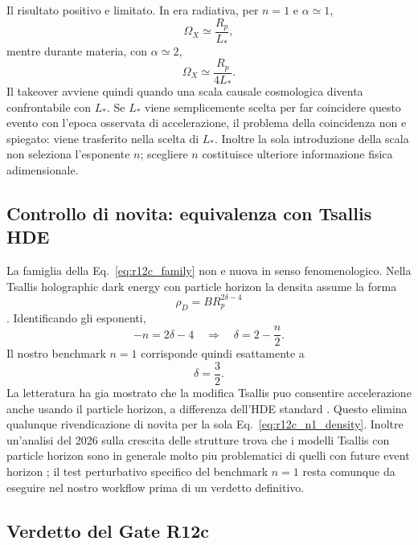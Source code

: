 \documentclass[11pt,a4paper]{article}
\begin{document}
Il risultato positivo e limitato. In era radiativa, per $n=1$ e $\alpha\simeq1$,
\begin{equation}
 \Omega_X\simeq\frac{R_p}{L_*},
\end{equation}
mentre durante materia, con $\alpha\simeq2$,
\begin{equation}
 \Omega_X\simeq\frac{R_p}{4L_*}.
\end{equation}
Il takeover avviene quindi quando una scala causale cosmologica diventa confrontabile con $L_*$. Se $L_*$ viene semplicemente scelta per far coincidere questo evento con l'epoca osservata di accelerazione, il problema della coincidenza non e spiegato: viene trasferito nella scelta di $L_*$. Inoltre la sola introduzione della scala non seleziona l'esponente $n$; scegliere $n$ costituisce ulteriore informazione fisica adimensionale.

\subsection{Controllo di novita: equivalenza con Tsallis HDE}

La famiglia della Eq.~\eqref{eq:r12c_family} non e nuova in senso fenomenologico. Nella Tsallis holographic dark energy con particle horizon la densita assume la forma
\begin{equation}
 \rho_D=B R_p^{2\delta-4}
\end{equation}
\cite{Zadeh2018}. Identificando gli esponenti,
\begin{equation}
 -n=2\delta-4
 \quad\Longrightarrow\quad
 \delta=2-\frac n2.
\end{equation}
Il nostro benchmark $n=1$ corrisponde quindi esattamente a
\begin{equation}
 \boxed{\delta=\frac32.}
\end{equation}
La letteratura ha gia mostrato che la modifica Tsallis puo consentire accelerazione anche usando il particle horizon, a differenza dell'HDE standard \cite{Zadeh2018}. Questo elimina qualunque rivendicazione di novita per la sola Eq.~\eqref{eq:r12c_n1_density}. Inoltre un'analisi del 2026 sulla crescita delle strutture trova che i modelli Tsallis con particle horizon sono in generale molto piu problematici di quelli con future event horizon \cite{Das2026}; il test perturbativo specifico del benchmark $n=1$ resta comunque da eseguire nel nostro workflow prima di un verdetto definitivo.

\subsection{Verdetto del Gate R12c}
\end{document}
